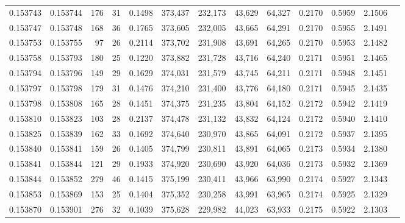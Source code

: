\begin{tabular}{rrrrrrrrrrrrr}
0.153743 & 0.153744 &   176 &  31 &                                     0.1498 & 373,437 & 232,173 &  43,629 &  64,327 & 0.2170 & 0.5959 & 2.1506 \\
0.153747 & 0.153748 &   168 &  36 &                                     0.1765 & 373,605 & 232,005 &  43,665 &  64,291 & 0.2170 & 0.5955 & 2.1491 \\
0.153753 & 0.153755 &    97 &  26 &                                     0.2114 & 373,702 & 231,908 &  43,691 &  64,265 & 0.2170 & 0.5953 & 2.1482 \\
0.153758 & 0.153793 &   180 &  25 &                                     0.1220 & 373,882 & 231,728 &  43,716 &  64,240 & 0.2171 & 0.5951 & 2.1465 \\
0.153794 & 0.153796 &   149 &  29 &                                     0.1629 & 374,031 & 231,579 &  43,745 &  64,211 & 0.2171 & 0.5948 & 2.1451 \\
0.153797 & 0.153798 &   179 &  31 &                                     0.1476 & 374,210 & 231,400 &  43,776 &  64,180 & 0.2171 & 0.5945 & 2.1435 \\
0.153798 & 0.153808 &   165 &  28 &                                     0.1451 & 374,375 & 231,235 &  43,804 &  64,152 & 0.2172 & 0.5942 & 2.1419 \\
0.153810 & 0.153823 &   103 &  28 &                                     0.2137 & 374,478 & 231,132 &  43,832 &  64,124 & 0.2172 & 0.5940 & 2.1410 \\
0.153825 & 0.153839 &   162 &  33 &                                     0.1692 & 374,640 & 230,970 &  43,865 &  64,091 & 0.2172 & 0.5937 & 2.1395 \\
0.153840 & 0.153841 &   159 &  26 &                                     0.1405 & 374,799 & 230,811 &  43,891 &  64,065 & 0.2173 & 0.5934 & 2.1380 \\
0.153841 & 0.153844 &   121 &  29 &                                     0.1933 & 374,920 & 230,690 &  43,920 &  64,036 & 0.2173 & 0.5932 & 2.1369 \\
0.153844 & 0.153852 &   279 &  46 &                                     0.1415 & 375,199 & 230,411 &  43,966 &  63,990 & 0.2174 & 0.5927 & 2.1343 \\
0.153853 & 0.153869 &   153 &  25 &                                     0.1404 & 375,352 & 230,258 &  43,991 &  63,965 & 0.2174 & 0.5925 & 2.1329 \\
0.153870 & 0.153901 &   276 &  32 &                                     0.1039 & 375,628 & 229,982 &  44,023 &  63,933 & 0.2175 & 0.5922 & 2.1303 \\

\end{tabular}
